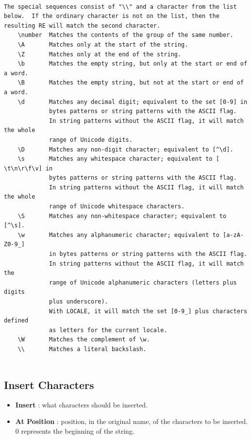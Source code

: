 \documentclass[10pt, a4paper]{scrartcl}
\begin{document}
\begin{itemize}
\begin{verbatim}
   
The special sequences consist of "\\" and a character from the list
below.  If the ordinary character is not on the list, then the
resulting RE will match the second character.
    \number  Matches the contents of the group of the same number.
    \A       Matches only at the start of the string.
    \Z       Matches only at the end of the string.
    \b       Matches the empty string, but only at the start or end of a word.
    \B       Matches the empty string, but not at the start or end of a word.
    \d       Matches any decimal digit; equivalent to the set [0-9] in
             bytes patterns or string patterns with the ASCII flag.
             In string patterns without the ASCII flag, it will match the whole
             range of Unicode digits.
    \D       Matches any non-digit character; equivalent to [^\d].
    \s       Matches any whitespace character; equivalent to [ \t\n\r\f\v] in
             bytes patterns or string patterns with the ASCII flag.
             In string patterns without the ASCII flag, it will match the whole
             range of Unicode whitespace characters.
    \S       Matches any non-whitespace character; equivalent to [^\s].
    \w       Matches any alphanumeric character; equivalent to [a-zA-Z0-9_]
             in bytes patterns or string patterns with the ASCII flag.
             In string patterns without the ASCII flag, it will match the
             range of Unicode alphanumeric characters (letters plus digits
             plus underscore).
             With LOCALE, it will match the set [0-9_] plus characters defined
             as letters for the current locale.
    \W       Matches the complement of \w.
    \\       Matches a literal backslash.


\end{verbatim}
         \endgroup
\end{itemize}

\subsection*{Insert Characters}
\begin{itemize}
        \item \textbf{Insert} : what characters should be inserted.
        \item \textbf{At Position} : position, in the original name, of the characters to be inserted. 0 represents the beginning of the string.
\end{itemize}
\end{document}
